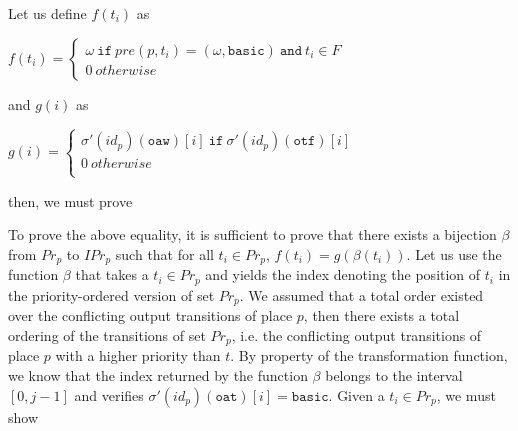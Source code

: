 \documentclass[dvipsnames,12pt]{article}
\begin{document}
\begin{niproof}
\begin{enumerate}
\begin{itemize}
\begin{itemize}
        Let us define $f(t_i)$ as
        \begin{center}
          $f(t_i)=\begin{cases}
            \omega~\mathtt{if}~pre(p,t_i)=(\omega,\mathtt{basic})~\mathtt{and}~t_i\in{}F\\
            0~otherwise
          \end{cases}$
        \end{center}
        and $g(i)$ as              
        \begin{center}
          $g(i)=\begin{cases}
            \sigma'(id_p)(\texttt{oaw})[i]~\mathtt{if}~\sigma'(id_p)(\texttt{otf})[i]\\
            0~otherwise\\
          \end{cases}$
        \end{center}

        then, we must prove

        To prove the above equality, it is sufficient to prove that
        there exists a bijection $\beta$ from $Pr_p$ to $IPr_p$ such
        that for all $t_i\in{}Pr_p$, $f(t_i)=g(\beta(t_i))$. Let us
        use the function $\beta$ that takes a $t_i\in{}Pr_p$ and
        yields the index denoting the position of $t_i$ in the
        priority-ordered version of set $Pr_p$. We assumed that a
        total order existed over the conflicting output transitions of
        place $p$, then there exists a total ordering of the
        transitions of set $Pr_p$, i.e. the conflicting output
        transitions of place $p$ with a higher priority than $t$. By
        property of the \hilecop{} transformation function, we know
        that the index returned by the function $\beta$ belongs to the
        interval $[0,j-1]$ and verifies
        $\sigma'(id_p)(\texttt{oat})[i]=\texttt{basic}$.  Given a
        $t_i\in{}Pr_p$, we must show 


\end{itemize}
\end{itemize}
\end{enumerate}
\end{niproof}
\end{document}
